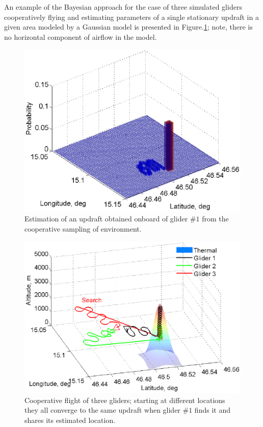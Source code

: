 \documentclass[letterpaper, 10 pt, conference]{ieeeconf}  %
\begin{document}
An example of the Bayesian approach for the case of three simulated gliders cooperatively flying and estimating parameters of a single stationary updraft in a given area modeled by a Gaussian model is presented in Figure.\ref{fig:SimPDF}; note, there is no horizontal component of airflow in the model.
\begin{figure}[thpb]
  \centering
  \includegraphics[scale=0.51]{Figures/Mapping_thermals.eps}
  \caption{Estimation of an updraft obtained onboard of glider $\#1$ from
  the cooperative sampling of environment.}
  \label{fig:SimPDF}
\end{figure}
\begin{figure}[thpb]
  \centering
  \includegraphics[scale=0.41]{Figures/paths_cooperative_flight.eps}
  \caption{Cooperative flight of three gliders; starting at different locations
  they all converge to the same updraft when glider $\#1$ finds it and
  shares its estimated location.}
  \label{fig:CoopFlightPaths}
\end{figure}
\end{document}
